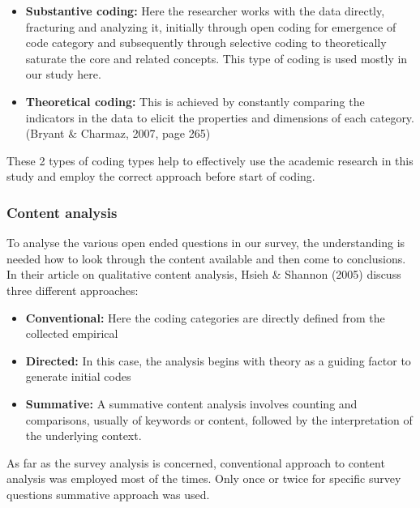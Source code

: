 \begin{itemize}
    \item \textbf{Substantive coding:} Here the researcher works with the data directly, fracturing and analyzing it, initially through open coding for emergence of code category and subsequently through selective coding to theoretically saturate the core and related concepts. This type of coding is used mostly in our study here.\\
    \item \textbf{Theoretical coding:} This is achieved by constantly comparing the indicators in the data to elicit the properties and dimensions of each category. (Bryant & Charmaz, 2007, page 265)\\
\end{itemize}

These 2 types of coding types help to effectively use the academic research in this study and employ the correct approach before start of coding.\\

\subsubsection{Content analysis}
To analyse the various open ended questions in our survey, the understanding is needed how to look through the content available and then come to conclusions. In their article on qualitative content analysis, Hsieh & Shannon (2005) discuss three different approaches:\\

\begin{itemize}
    \item \textbf{Conventional:} Here the coding categories are directly defined from the collected empirical \\
    \item \textbf{Directed:} In this case, the analysis begins with theory as a guiding factor to generate initial codes\\
    \item \textbf{Summative:} A summative content analysis involves counting and comparisons, usually of keywords or content, followed by the interpretation of the underlying context.\\
\end{itemize}
As far as the survey analysis is concerned, conventional approach to content analysis was employed most of the times. Only once or twice for specific survey questions summative approach was used.\\




